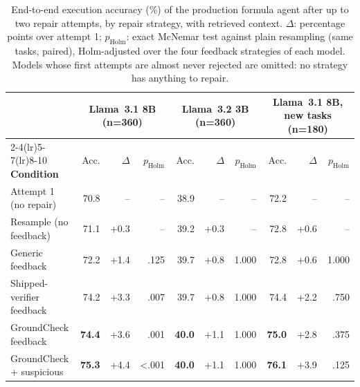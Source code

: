 \begin{table}[!t]
\caption{End-to-end execution accuracy (\%) of the production formula agent after up to two repair attempts, by repair strategy, with retrieved context. $\Delta$: percentage points over attempt 1; $p_{\text{Holm}}$: exact McNemar test against plain resampling (same tasks, paired), Holm-adjusted over the four feedback strategies of each model. Models whose first attempts are almost never rejected are omitted: no strategy has anything to repair.}
\label{tab:e5-repair}

\centering\footnotesize
\begin{tabular}{l rrr rrr rrr}
\toprule
& \multicolumn{3}{c}{\textbf{Llama~3.1 8B} (n=360)} & \multicolumn{3}{c}{\textbf{Llama~3.2 3B} (n=360)} & \multicolumn{3}{c}{\textbf{Llama~3.1 8B, new tasks} (n=180)} \\
\cmidrule(lr){2-4}\cmidrule(lr){5-7}\cmidrule(lr){8-10}
\textbf{Condition} & Acc. & $\Delta$ & $p_{\text{Holm}}$ & Acc. & $\Delta$ & $p_{\text{Holm}}$ & Acc. & $\Delta$ & $p_{\text{Holm}}$ \\
\midrule
Attempt 1 (no repair) & 70.8 & -- & -- & 38.9 & -- & -- & 72.2 & -- & -- \\
Resample (no feedback) & 71.1 & +0.3 & -- & 39.2 & +0.3 & -- & 72.8 & +0.6 & -- \\
Generic feedback & 72.2 & +1.4 & .125 & 39.7 & +0.8 & 1.000 & 72.8 & +0.6 & 1.000 \\
Shipped-verifier feedback & 74.2 & +3.3 & .007 & 39.7 & +0.8 & 1.000 & 74.4 & +2.2 & .750 \\
GroundCheck feedback & \textbf{74.4} & +3.6 & .001 & \textbf{40.0} & +1.1 & 1.000 & \textbf{75.0} & +2.8 & .375 \\
GroundCheck + suspicious & \textbf{75.3} & +4.4 & <.001 & \textbf{40.0} & +1.1 & 1.000 & \textbf{76.1} & +3.9 & .125 \\
\bottomrule
\end{tabular}
\end{table}
